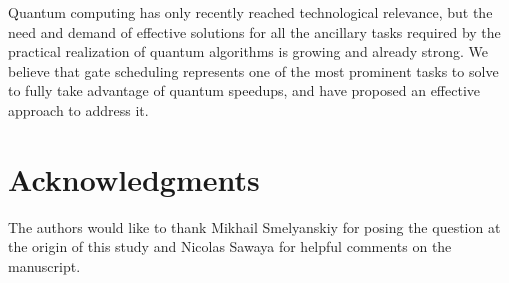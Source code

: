 \documentclass[%
onecolumn,pra,
superscriptaddress,
nofootinbib,
 amsmath,amssymb,
 aps,
11pt,
]{revtex4-1}
\begin{document}
Quantum computing has only recently reached technological relevance, but the need and demand of effective solutions for all the ancillary tasks required by the practical realization of quantum algorithms is growing and already strong. We believe that gate scheduling represents one of the most prominent tasks to solve to fully take advantage of quantum speedups, and have proposed an effective approach to address it.



\section*{Acknowledgments}
The authors would like to thank Mikhail Smelyanskiy for posing the question at the origin of this study and Nicolas Sawaya for helpful comments on the manuscript.





\appendix
\renewcommand\thefigure{\thesection.\arabic{figure}}
\renewcommand\thetable{\thesection.\arabic{table}}
\setcounter{figure}{0}
\setcounter{table}{0}
\end{document}
